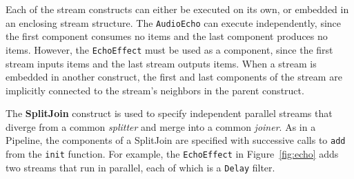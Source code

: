Each of the stream constructs can either be executed on its own, or
embedded in an enclosing stream structure.  The {\tt AudioEcho} can
execute independently, since the first component consumes no items and
the last component produces no items.  However, the {\tt EchoEffect}
must be used as a component, since the first stream inputs items and the
last stream outputs items.  When a stream is embedded in another
construct, the first and last components of the stream are implicitly
connected to the stream's neighbors in the parent construct.



The {\bf SplitJoin} construct is used to specify independent parallel
streams that diverge from a common {\it splitter} and merge into a
common {\it joiner}.  As in a Pipeline, the components of a SplitJoin
are specified with successive calls to {\tt add} from the {\tt init}
function.  For example, the {\tt EchoEffect} in Figure~\ref{fig:echo}
adds two streams that run in parallel, each of which is a {\tt Delay}
filter.

